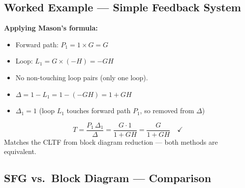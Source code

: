 \documentclass[12pt,a4paper]{article}
\begin{document}
\subsection{Worked Example — Simple Feedback System}

\begin{tcolorbox}[tikzbox, title={SFG Representation}]
\centering
{}
\end{tcolorbox}

\textbf{Applying Mason's formula:}
\begin{itemize}[leftmargin=*, itemsep=2pt]
  \item Forward path: $P_1 = 1 \times G = G$
  \item Loop: $L_1 = G \times (-H) = -GH$
  \item No non-touching loop pairs (only one loop).
  \item $\Delta = 1 - L_1 = 1 - (-GH) = 1 + GH$
  \item $\Delta_1 = 1$ \quad (loop $L_1$ touches forward path $P_1$, so removed from $\Delta$)
\end{itemize}

\begin{tcolorbox}[formulabox]
$$T = \frac{P_1\,\Delta_1}{\Delta} = \frac{G \cdot 1}{1 + GH} = \frac{G}{1 + GH} \quad \checkmark$$
Matches the CLTF from block diagram reduction — both methods are equivalent.
\end{tcolorbox}

\subsection{SFG vs.\ Block Diagram — Comparison}
\end{document}
